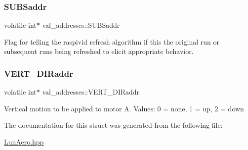 \subsubsection{\texorpdfstring{S\+U\+B\+Saddr}{SUBSaddr}}
{\footnotesize\ttfamily volatile int$\ast$ val\+\_\+addresses\+::\+S\+U\+B\+Saddr}

Flag for telling the raspivid refresh algorithm if this the original run or subsequent runs being refreshed to elicit appropriate behavior. \mbox{\label{structval__addresses_a0bc3ea6915b32a17b4c333b865c81ea9}} 
\subsubsection{\texorpdfstring{V\+E\+R\+T\+\_\+\+D\+I\+Raddr}{VERT\_DIRaddr}}
{\footnotesize\ttfamily volatile int$\ast$ val\+\_\+addresses\+::\+V\+E\+R\+T\+\_\+\+D\+I\+Raddr}

Vertical motion to be applied to motor A. Values\+: 0 = none, 1 = up, 2 = down 

The documentation for this struct was generated from the following file\+:\begin{DoxyCompactItemize}
\item 
\hyperlink{LunAero_8hpp}{Lun\+Aero.\+hpp}\end{DoxyCompactItemize}
